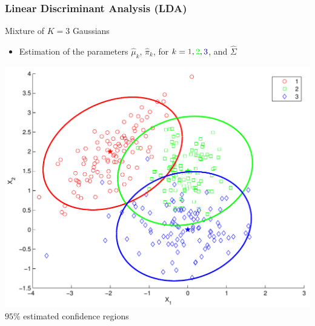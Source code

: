 \documentclass[compress, smaller, serif, 9pt]{beamer}
\begin{document}
\begin{frame}
  \frametitle{Linear Discriminant Analysis  (LDA)}
\begin{block}{Mixture of $K=3$ Gaussians}
\begin{itemize}
   \item Estimation of the parameters  $\hat{\mu}_k$, $\hat{\pi}_k$, for
   $k= \textcolor{red}{1},\textcolor{green}{2},\textcolor{blue}{3}$, and $\hat{\Sigma}$
\end{itemize}
\end{block}
\vspace*{-5mm}

\begin{center}
  \includegraphics[width=.65\textwidth]{lin_analysis_CI.pdf} \\
  $95\%$ estimated confidence regions
\end{center}

\end{frame}
\end{document}
